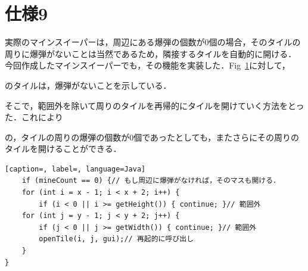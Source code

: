 \documentclass[a4j,11pt]{jsarticle}
\newcommand{\figref}[1]{Fig\ \ref{#1}}
\begin{document}
\section*{仕様9}
\setcounter{section}{9}
実際のマインスイーパーは，周辺にある爆弾の個数が0個の場合，そのタイルの周りに爆弾がないことは当然であるため，隣接するタイルを自動的に開ける．
今回作成したマインスイーパーでも，その機能を実装した．\figref{fig:タイルの一部}に対して，のタイルは，爆弾がないことを示している．\par
そこで，範囲外を除いて周りのタイルを再帰的にタイルを開けていく方法をとった．これによりの，タイルの周りの爆弾の個数が0個であったとしても，またさらにその周りのタイルを開けることができる．
\begin{figure}[h]
    \centering
    \caption{}
    \label{fig:タイルの一部}
\end{figure}
\begin{lstlisting}[caption=, label=, language=Java]
    if (mineCount == 0) {// もし周辺に爆弾がなければ，そのマスも開ける．
    for (int i = x - 1; i < x + 2; i++) {
        if (i < 0 || i >= getHeight()) { continue; }// 範囲外
    for (int j = y - 1; j < y + 2; j++) {
        if (j < 0 || j >= getWidth()) { continue; }// 範囲外
        openTile(i, j, gui);// 再起的に呼び出し
    }
}
\end{lstlisting}
\newpage
\end{document}

